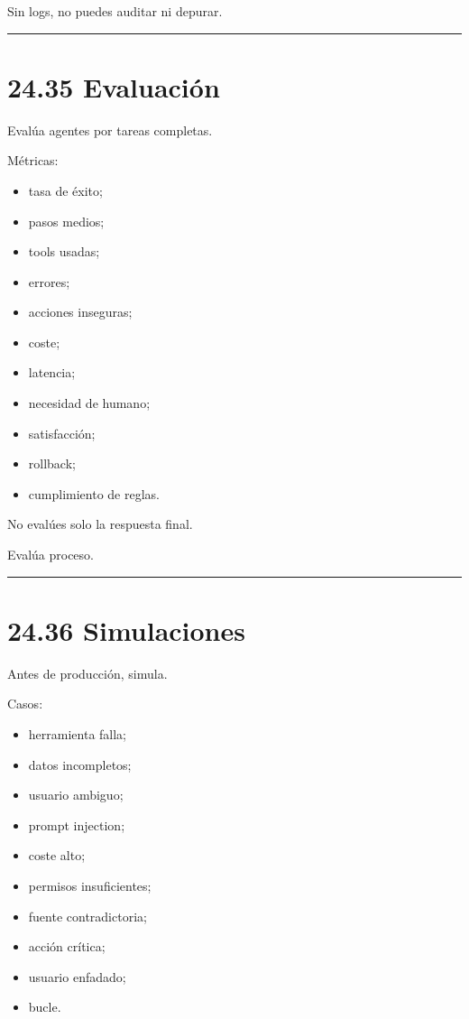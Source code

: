 Sin logs, no puedes auditar ni depurar.

\begin{center}\rule{0.5\linewidth}{0.5pt}\end{center}

\section{24.35 Evaluación}\label{evaluaciuxf3n-2}

Evalúa agentes por tareas completas.

Métricas:

\begin{itemize}
\tightlist
\item
  tasa de éxito;
\item
  pasos medios;
\item
  tools usadas;
\item
  errores;
\item
  acciones inseguras;
\item
  coste;
\item
  latencia;
\item
  necesidad de humano;
\item
  satisfacción;
\item
  rollback;
\item
  cumplimiento de reglas.
\end{itemize}

No evalúes solo la respuesta final.

Evalúa proceso.

\begin{center}\rule{0.5\linewidth}{0.5pt}\end{center}

\section{24.36 Simulaciones}\label{simulaciones}

Antes de producción, simula.

Casos:

\begin{itemize}
\tightlist
\item
  herramienta falla;
\item
  datos incompletos;
\item
  usuario ambiguo;
\item
  prompt injection;
\item
  coste alto;
\item
  permisos insuficientes;
\item
  fuente contradictoria;
\item
  acción crítica;
\item
  usuario enfadado;
\item
  bucle.
\end{itemize}

